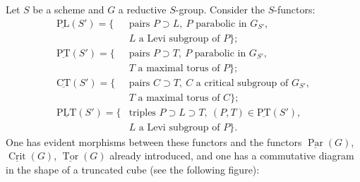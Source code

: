 \label{XXVI.3.15}
Let $S$ be a scheme and $G$ a reductive $S$-group. Consider the $S$-functors:
\[
\begin{aligned}
\underline{\mathrm{PL}}(S')=\{&\text{pairs }P\supset L,\ P\text{ parabolic in }G_{S'},\\
&L\text{ a Levi subgroup of }P\};\\
\underline{\mathrm{PT}}(S')=\{&\text{pairs }P\supset T,\ P\text{ parabolic in }G_{S'},\\
&T\text{ a maximal torus of }P\};\\
\underline{\mathrm{CT}}(S')=\{&\text{pairs }C\supset T,\ C\text{ a critical subgroup of }G_{S'},\\
&T\text{ a maximal torus of }C\};\\
\underline{\mathrm{PLT}}(S')=\{&\text{triples }P\supset L\supset T,\ (P,T)\in\underline{\mathrm{PT}}(S'),\\
&L\text{ a Levi subgroup of }P\}.
\end{aligned}
\]
One has evident morphisms between these functors and the functors $\underline{\operatorname{Par}}(G)$, $\underline{\operatorname{Crit}}(G)$, $\underline{\operatorname{Tor}}(G)$ already introduced, and one has a commutative diagram in the shape of a truncated cube (see the following figure):

